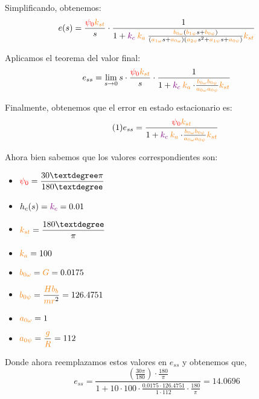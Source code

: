 Simplificando, obtenemos:
\begin{equation}
  e(s) = \frac{\rojo{\psi_0}\nara{k_{st}}}{s} \cdot \frac{1}{1+\mora{k_c}\nara{k_a} \frac{\nara{\nara{b_{0\omega}}}\left(\nara{b_{1\psi}}s + \nara{b_{0\psi}}\right)}
  {\left(\nara{a_{1\omega}}s + \nara{a_{0\omega}}\right)\left(\nara{a_{2\psi}}s^{2} + \nara{a_{1\psi}}s + \nara{a_{0\psi}}\right)}\nara{k_{st}}}
\end{equation}


Aplicamos el teorema del valor final:
\begin{equation}
  e_{ss} = \lim_{s \to 0} s \cdot \frac{\rojo{\psi_0}\nara{k_{st}}}{s} \cdot \frac{1}{1 + \mora{k_c}\nara{k_a} \cdot \frac{\nara{b_{0\omega}b_{0\psi}}}{\nara{a_{0\omega}a_{0\psi}}} \nara{k_{st}}}
\end{equation}


Finalmente, obtenemos que el error en estado estacionario es:
\begin{equation} \tag{1} \label{eq:e_ss_symbolic}
  e_{ss} = \frac{\rojo{\psi_0}\nara{k_{st}}}{1 + \mora{k_c}\nara{k_a} \cdot \frac{\nara{b_{0\omega}b_{0\psi}}}{\nara{a_{0\omega}a_{0\psi}}} \nara{k_{st}}}
\end{equation}

Ahora bien sabemos que los valores correspondientes son:
\begin{multicols}{3}
  \begin{itemize}
    \item \( \rojo{\psi_0} = \displaystyle\frac{30° \pi}{180°} \)
    \item \(h_c(s) = \mathbin{\color{violet}k_{c}} = 0.01\)
    \item \(\nara{k_{st}} = \displaystyle\frac{180°}{\pi}\)
    \item \(\nara{k_{a}} = 100 \)
    \item \(\nara{b_{0\omega}} = \nara{G} =0.0175 \)
    \item \(\nara{b_{0\psi}} = \displaystyle\frac{\nara{Hb_b}}{\nara{mr}^2} = 126.4751\)
    \item \(\nara{a_{0\omega}} = 1 \)
    \item \(\nara{a_{0\psi}} = \displaystyle\frac{\nara{g}}{\nara{R}} =112 \)
  \end{itemize}
\end{multicols}


Donde ahora reemplazamos estos valores en \(e_{ss}\) y obtenemos que,
\begin{equation}
  e_{ss} = \frac{\left(\frac{30 \pi}{180}\right) \cdot \frac{180}{\pi}}{1 + 10 \cdot 100 \cdot \frac{0.0175 \cdot 126.4751}{1 \cdot 112} \cdot \frac{180}{\pi}} = 14.0696
\end{equation}

